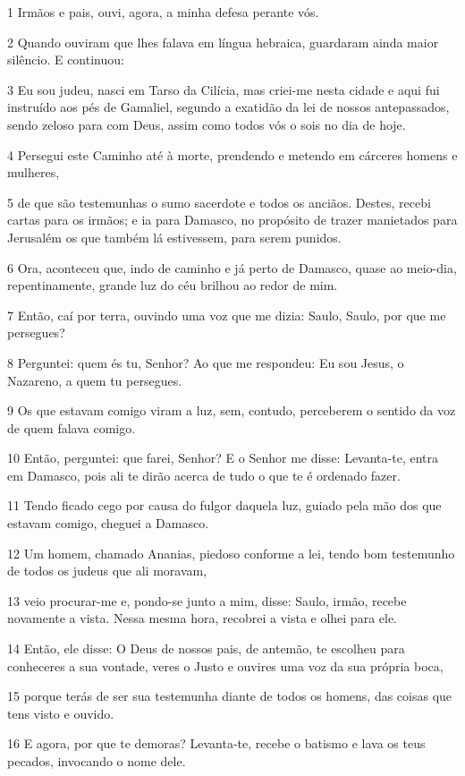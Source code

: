 \par 1 Irmãos e pais, ouvi, agora, a minha defesa perante vós.
\par 2 Quando ouviram que lhes falava em língua hebraica, guardaram ainda maior silêncio. E continuou:
\par 3 Eu sou judeu, nasci em Tarso da Cilícia, mas criei-me nesta cidade e aqui fui instruído aos pés de Gamaliel, segundo a exatidão da lei de nossos antepassados, sendo zeloso para com Deus, assim como todos vós o sois no dia de hoje.
\par 4 Persegui este Caminho até à morte, prendendo e metendo em cárceres homens e mulheres,
\par 5 de que são testemunhas o sumo sacerdote e todos os anciãos. Destes, recebi cartas para os irmãos; e ia para Damasco, no propósito de trazer manietados para Jerusalém os que também lá estivessem, para serem punidos.
\par 6 Ora, aconteceu que, indo de caminho e já perto de Damasco, quase ao meio-dia, repentinamente, grande luz do céu brilhou ao redor de mim.
\par 7 Então, caí por terra, ouvindo uma voz que me dizia: Saulo, Saulo, por que me persegues?
\par 8 Perguntei: quem és tu, Senhor? Ao que me respondeu: Eu sou Jesus, o Nazareno, a quem tu persegues.
\par 9 Os que estavam comigo viram a luz, sem, contudo, perceberem o sentido da voz de quem falava comigo.
\par 10 Então, perguntei: que farei, Senhor? E o Senhor me disse: Levanta-te, entra em Damasco, pois ali te dirão acerca de tudo o que te é ordenado fazer.
\par 11 Tendo ficado cego por causa do fulgor daquela luz, guiado pela mão dos que estavam comigo, cheguei a Damasco.
\par 12 Um homem, chamado Ananias, piedoso conforme a lei, tendo bom testemunho de todos os judeus que ali moravam,
\par 13 veio procurar-me e, pondo-se junto a mim, disse: Saulo, irmão, recebe novamente a vista. Nessa mesma hora, recobrei a vista e olhei para ele.
\par 14 Então, ele disse: O Deus de nossos pais, de antemão, te escolheu para conheceres a sua vontade, veres o Justo e ouvires uma voz da sua própria boca,
\par 15 porque terás de ser sua testemunha diante de todos os homens, das coisas que tens visto e ouvido.
\par 16 E agora, por que te demoras? Levanta-te, recebe o batismo e lava os teus pecados, invocando o nome dele.
